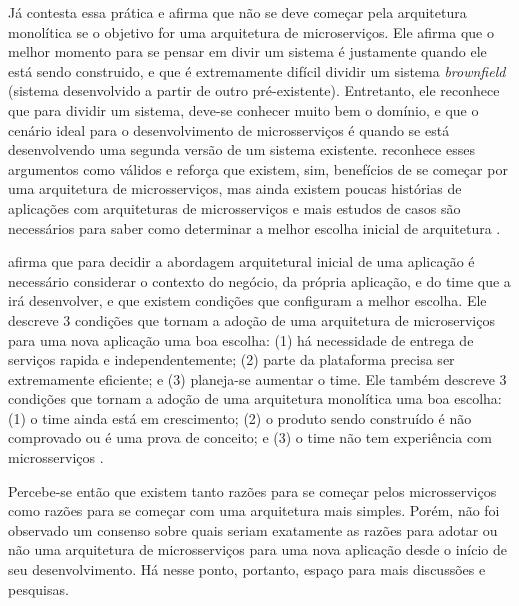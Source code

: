 Já  contesta essa prática e afirma que não se deve começar pela arquitetura monolítica se o objetivo for uma arquitetura de microserviços. Ele afirma que o melhor momento para se pensar em divir um sistema é justamente quando ele está sendo construido, e que é extremamente difícil dividir um sistema \emph{brownfield} (sistema desenvolvido a partir de outro pré-existente). Entretanto, ele reconhece que para dividir um sistema, deve-se conhecer muito bem o domínio, e que o cenário ideal para o desenvolvimento de microsserviços é quando se está desenvolvendo uma segunda versão de um sistema existente.  reconhece esses argumentos como válidos e reforça que existem, sim, benefícios de se começar por uma arquitetura de microsserviços, mas ainda existem poucas histórias de aplicações com arquiteturas de microsserviços e mais estudos de casos são necessários para saber como determinar a melhor escolha inicial de arquitetura \cite{dontStartWithMonolith-tilkov,martin-fowler-monolith-first}.


 afirma que para decidir a abordagem arquitetural inicial de uma aplicação é necessário considerar o contexto do negócio, da própria aplicação, e do time que a irá desenvolver, e que existem condições que configuram a melhor escolha. Ele descreve 3 condições que tornam a adoção de uma arquitetura de microserviços para uma nova aplicação uma boa escolha: (1) há necessidade de entrega de serviços rapida e independentemente; (2) parte da plataforma precisa ser extremamente eficiente; e (3) planeja-se aumentar o time. Ele também descreve 3 condições que tornam a adoção de uma arquitetura monolítica uma boa escolha: (1) o time ainda está em crescimento; (2) o produto sendo construído é não comprovado ou é uma prova de conceito; e (3) o time não tem experiência com microsserviços \cite{monolith-or-microservices}.

Percebe-se então que existem tanto razões para se começar pelos microsserviços como razões para se começar com uma arquitetura mais simples. Porém, não foi observado um consenso sobre quais seriam exatamente as razões para adotar ou não uma arquitetura de microsserviços para uma nova aplicação desde o início de seu desenvolvimento. Há nesse ponto, portanto, espaço para mais discussões e pesquisas.

